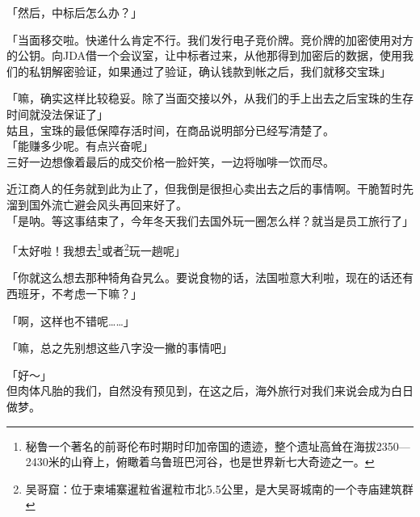 「然后，中标后怎么办？」

「当面移交啦。快递什么肯定不行。我们发行电子竞价牌。竞价牌的加密使用对方的公钥。向JDA借一个会议室，让中标者过来，从他那得到加密后的数据，使用我们的私钥解密验证，如果通过了验证，确认钱款到帐之后，我们就移交宝珠」

「嘛，确实这样比较稳妥。除了当面交接以外，从我们的手上出去之后宝珠的生存时间就没法保证了」\\

姑且，宝珠的最低保障存活时间，在商品说明部分已经写清楚了。\\

「能赚多少呢。有点兴奋呢」\\

三好一边想像着最后的成交价格一脸奸笑，一边将咖啡一饮而尽。

近江商人的任务就到此为止了，但我倒是很担心卖出去之后的事情啊。干脆暂时先溜到国外流亡避会风头再回来好了。\\

「是呐。等这事结束了，今年冬天我们去国外玩一圈怎么样？就当是员工旅行了」

「太好啦！我想去\footnote{秘鲁一个著名的前哥伦布时期时印加帝国的遗迹，整个遗址高耸在海拔2350—2430米的山脊上，俯瞰着乌鲁班巴河谷，也是世界新七大奇迹之一。}或者\footnote{吴哥窟：位于柬埔寨暹粒省暹粒市北5.5公里，是大吴哥城南的一个寺庙建筑群}玩一趟呢」

「你就这么想去那种犄角旮旯么。要说食物的话，法国啦意大利啦，现在的话还有西班牙，不考虑一下嘛？」

「啊，这样也不错呢……」

「嘛，总之先别想这些八字没一撇的事情吧」

「好～」\\

但肉体凡胎的我们，自然没有预见到，在这之后，海外旅行对我们来说会成为白日做梦。\\
